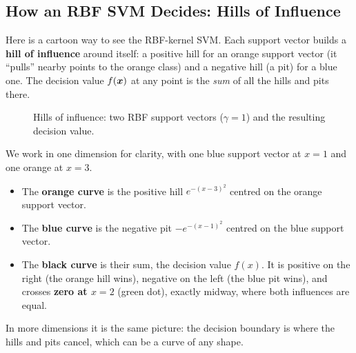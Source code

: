 \subsection{How an RBF SVM Decides: Hills of Influence}

Here is a cartoon way to see the RBF-kernel SVM. Each support vector builds a \textbf{hill of influence} around itself: a positive hill for an orange support vector (it ``pulls'' nearby points to the orange class) and a negative hill (a pit) for a blue one. The decision value $f(\boldsymbol{x})$ at any point is the \emph{sum} of all the hills and pits there.

\begin{figure}[!htbp]
\centering
{}
\caption{Hills of influence: two RBF support vectors ($\gamma=1$) and the resulting decision value.}\label{fig:hills}
\end{figure}

\begin{explain}
We work in one dimension for clarity, with one blue support vector at $x=1$ and one orange at $x=3$.

\begin{itemize}
  \item The \textbf{orange curve} is the positive hill $e^{-(x-3)^2}$ centred on the orange support vector.
  \item The \textbf{blue curve} is the negative pit $-e^{-(x-1)^2}$ centred on the blue support vector.
  \item The \textbf{black curve} is their sum, the decision value $f(x)$. It is positive on the right (the orange hill wins), negative on the left (the blue pit wins), and crosses \textbf{zero at $x=2$} (green dot), exactly midway, where both influences are equal.
\end{itemize}
In more dimensions it is the same picture: the decision boundary is where the hills and pits cancel, which can be a curve of any shape.
\end{explain}

